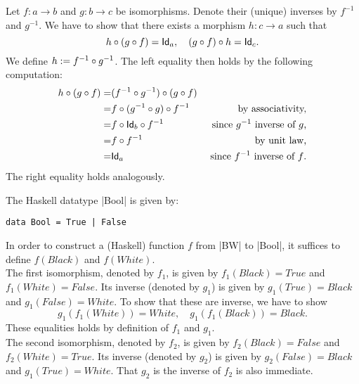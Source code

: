 \begin{solution}\label{sol:compofiso}
Let $f: a\to b$ and $g:b\to c$ be isomorphisms. Denote their (unique) inverses by $f^{-1}$ and $g^{-1}$. We have to show that there exists a morphism $h : c\to a$ such that 
\[
\co{(\co{f}{g})}{h} = \Id[a], \quad \co{h}{(\co{f}{g})} = \Id[c].
\]
We define $h := \co{g^{-1}}{f^{-1}}$. The left equality then holds by the following computation:
\begin{eqnarray*}
\co{(\co{f}{g})}{h} =& \co{(\co{f}{g})}{(\co{g^{-1}}{f^{-1}})} &\\
	=& \co{f^{-1}}{\co{(\co{g}{g^{-1}})}{f}} &\text{ by associativity,}\\
	=& \co{f^{-1}}{\co{\Id[b]}{f}} &\text{ since $g^{-1}$ inverse of $g$,}\\
	=& \co{f^{-1}}{f} &\text{ by unit law,}\\
	=& \Id[a] &\text{ since $f^{-1}$ inverse of $f$.}
\end{eqnarray*}
The right equality holds analogously.
\end{solution}


\begin{solution}\label{sol:iso-bool}
The Haskell datatype |Bool| is given by:
\begin{lstlisting}
data Bool = True | False
\end{lstlisting}
In order to construct a (Haskell) function $f$ from |BW| to |Bool|, it suffices to define $f(Black)$ and $f(White)$.\\
The first isomorphism, denoted by $f_1$, is given by $f_1(Black)=True$ and $f_1(White) = False$. Its inverse (denoted by $g_1$) is given by $g_1(True) = Black$ and $g_1(False) = White$. To show that these are inverse, we have to show 
\[
g_1 (f_1 (White)) = White, \quad g_1 (f_1 (Black)) = Black.
\]
These equalities holds by definition of $f_1$ and $g_1$.\\
The second isomorphism, denoted by $f_2$, is given by $f_2(Black)=False$ and $f_2(White) = True$. Its inverse (denoted by $g_2$) is given by $g_2(False) = Black$ and $g_1(True) = White$. That $g_2$ is the inverse of $f_2$ is also immediate.
\end{solution}


